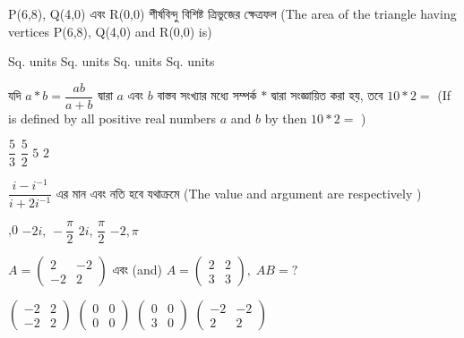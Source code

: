 \documentclass[addpoints]{exam}
\begin{document}
\begin{questions}
\question P(6,8), Q(4,0) এবং R(0,0)  শীর্ষবিন্দু বিশিষ্ট ত্রিভুজের ক্ষেত্রফল (The area of the triangle having vertices  P(6,8), Q(4,0) and R(0,0) is)

\begin{oneparchoices}
 Sq. units
 Sq. units
 Sq. units
 Sq. units
\end{oneparchoices}

\question  যদি $ a*b = \dfrac{ab}{a+b} $ দ্বারা $ a $ এবং $ b $ বাস্তব সংখ্যার মধ্যে সম্পর্ক $ * $ দ্বারা সংজ্ঞায়িত করা হয়, তবে $ 10*2 = $ (If is defined by all positive real numbers $ a $ and $ b $ by then $ 10*2 = $ )

\begin{oneparchoices}
\choice $ \dfrac{5}{3} $
\choice $ \dfrac{5}{2} $
\choice $ 5 $
\choice $ 2 $

\end{oneparchoices}

\question   $ \dfrac{i-i^{-1}}{i+2i^{-1}} $ এর মান এবং নতি হবে যথাক্রমে (The value and argument are respectively ) 

\begin{oneparchoices}
,0
\choice $ -2i,\, -\dfrac{\pi}{2} $
\choice $ 2i,\, \dfrac{\pi}{2} $
\choice $ -2, \pi $

\end{oneparchoices}

\question  $ A = \begin{pmatrix} 2 & -2\\ -2 & 2 \end{pmatrix}$ এবং (and) $ A = \begin{pmatrix} 2 & 2\\ 3 & 3 \end{pmatrix},\; AB=?$

\begin{oneparchoices}
\choice  $\begin{pmatrix} -2 & 2\\ -2 & 2 \end{pmatrix}$
\choice  $\begin{pmatrix} 0 & 0\\ 0 & 0 \end{pmatrix}$
\choice  $\begin{pmatrix} 0 & 0\\ 3 & 0 \end{pmatrix}$
\choice  $\begin{pmatrix} -2 & -2\\ 2 & 2 \end{pmatrix}$
\end{oneparchoices}


\end{questions}
\end{document}
